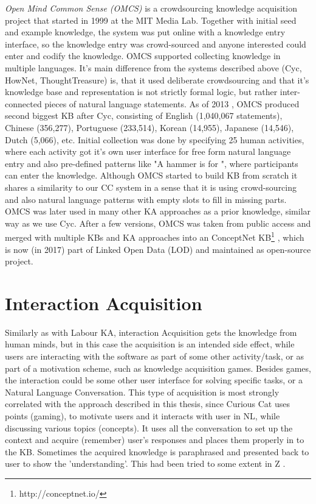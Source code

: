 \emph{Open Mind Common Sense (OMCS)} is a crowdsourcing knowledge acquisition project that started in 1999 at the MIT Media Lab. Together with initial seed and example knowledge, the system was put online with a knowledge entry interface, so the knowledge entry was crowd-sourced and anyone interested could enter and codify the knowledge. OMCS supported collecting knowledge in multiple languages. It's main difference from the systems described above (Cyc, HowNet, ThoughtTreasure) is, that it used deliberate crowdsourcing and that it's knowledge base and representation is not strictly formal logic, but rather inter-connected pieces of natural language statements. As of 2013 \parencite{Zang2013}, OMCS produced second biggest KB after Cyc, consisting of English (1,040,067 statements), Chinese (356,277), Portuguese (233,514), Korean (14,955), Japanese (14,546), Dutch (5,066), etc. Initial collection was done by specifying 25 human activities, where each activity got it's own user interface for free form natural language entry and also pre-defined patterns like "A hammer is for \underline{\hspace{1.5cm}}", where participants can enter the knowledge. Although OMCS started to build KB from scratch it shares a similarity to our CC system in a sense that it is using crowd-sourcing and also natural language patterns with empty slots to fill in missing parts. OMCS was later used in many other KA approaches as a prior knowledge, similar way as we use Cyc. After a few versions, OMCS was taken from public access and merged with multiple KBs and KA approaches into an ConceptNet KB\footnote{http://conceptnet.io/} \parencite{Speer2016}, which is now (in 2017) part of Linked Open Data (LOD) and maintained as open-source project.
 
\section{Interaction Acquisition}
Similarly as with Labour KA, interaction Acquisition gets the knowledge from human minds, but in this case the acquisition is an intended side effect, while users are interacting with the software as part of some other activity/task, or as part of a motivation scheme, such as knowledge acquisition games. Besides games, the interaction could be some other user interface for solving specific tasks, or a Natural Language Conversation. This type of acquisition is most strongly correlated with the approach described in this thesis, since Curious Cat uses points (gaming), to motivate users and it interacts with user in NL, while discussing various topics (concepts). It uses all the conversation to set up the context and acquire (remember) user's responses and places them properly in to the KB. Sometimes the acquired knowledge is paraphrased and presented back to user to show the 'understanding'. This had been tried to some extent in Z \parencite{Singh2002b}.
 

